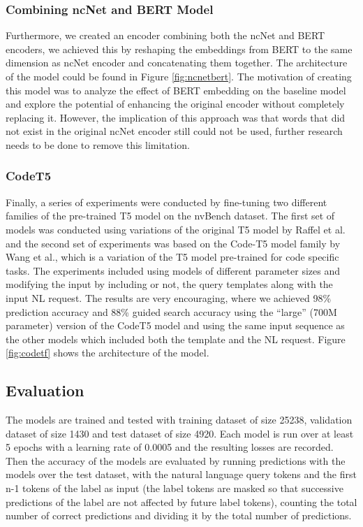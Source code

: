 \documentclass[
	a4paper, %
	10pt, %
	unnumberedsections, %
	twoside, %
]{t0003}
\begin{document}
\subsubsection{Combining ncNet and BERT Model} Furthermore, we created an encoder combining both the ncNet and BERT encoders, we achieved this by reshaping the embeddings from BERT to the same dimension as ncNet encoder and concatenating them together. The architecture of the model could be found in Figure \ref{fig:ncnetbert}. The motivation of creating this model was to analyze the effect of BERT embedding on the baseline model and explore the potential of enhancing the original encoder without completely replacing it. However, the implication of this approach was that words that did not exist in the original ncNet encoder still could not be used, further research needs to be done to remove this limitation.

\subsubsection{CodeT5} Finally, a series of experiments were conducted by fine-tuning two different families of the pre-trained T5 model on the nvBench dataset. The first set of models was conducted using variations of the original T5 model \cite{Raffel:2020qr} by Raffel et al. and the second set of experiments was based on the Code-T5 model family \cite{Yue:2021qr2} by Wang et al., which is a variation of the T5 model pre-trained for code specific tasks. The experiments included using models of different parameter sizes and modifying the input by including or not, the query templates along with the input NL request. The results are very encouraging, where we achieved 98\% prediction accuracy and 88\% guided search accuracy using the “large” (700M parameter) version of the CodeT5 model and using the same input sequence as the other models which included both the template and the NL request. Figure \ref{fig:codetf} shows the architecture of the model.

\subsection{Evaluation}

The models are trained and tested with training dataset of size 25238, validation dataset of size 1430 and test dataset of size 4920. Each model is run over at least 5 epochs with a learning rate of 0.0005 and the resulting losses are recorded.
Then the accuracy of the models are evaluated by running predictions with the models over the test dataset, with the natural language query tokens and the first n-1 tokens of the label as input (the label tokens are masked so that successive predictions of the label are not affected by future label tokens), counting the total number of correct predictions and dividing it by the total number of predictions.
\end{document}
